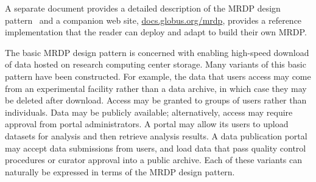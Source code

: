 \documentclass[10pt]{article}
\begin{document}
A separate document provides a detailed description of the MRDP design pattern~\cite{BMRDP}
and a companion web site, \url{docs.globus.org/mrdp}, provides a reference implementation that the reader can deploy
and adapt to build their own MRDP.

The basic MRDP design pattern is concerned with enabling high-speed download of data hosted
on research computing center storage.
Many variants of this basic pattern have been constructed.
For example, the data that users access may come from an experimental facility rather than a data archive, 
in which case they may be deleted after download. 
Access may be granted to groups of users rather than individuals.
Data may be publicly available; alternatively, access may require approval from portal administrators.
A portal may allow its users to upload datasets for analysis and then retrieve analysis results.
A data publication portal may accept data submissions from users, 
and load data that pass quality control procedures or curator approval into a public archive.
Each of these variants can naturally be expressed in terms of the MRDP design pattern.


%
\end{document}
